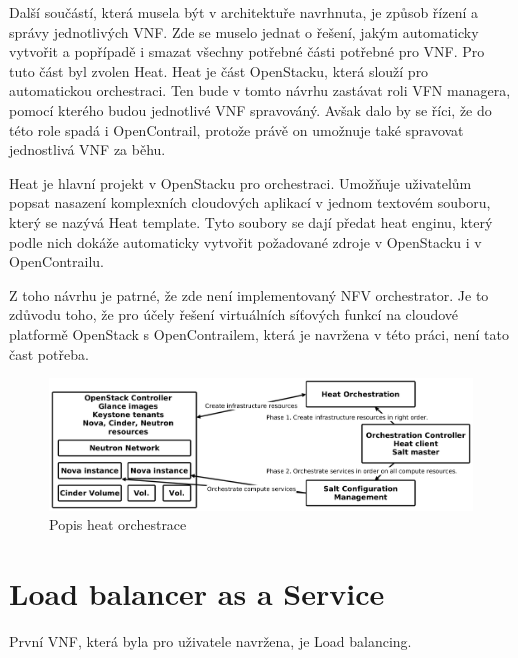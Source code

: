 Další součástí, která musela být v architektuře navrhnuta, je způsob řízení a správy jednotlivých VNF. Zde se muselo jednat o řešení, jakým automaticky vytvořit a popřípadě i smazat všechny potřebné části potřebné pro VNF. Pro tuto část byl zvolen Heat. Heat je část OpenStacku, která slouží pro automatickou orchestraci. Ten bude v tomto návrhu zastávat roli VFN managera, pomocí kterého budou jednotlivé VNF spravováný. Avšak dalo by se říci, že do této role spadá i OpenContrail, protože právě on umožnuje také spravovat jednostlivá VNF za běhu.  

Heat je hlavní projekt v OpenStacku pro orchestraci. Umožňuje uživatelům popsat nasazení komplexních cloudových aplikací v jednom textovém souboru, který se nazývá Heat template. Tyto soubory se dají předat heat enginu, který podle nich dokáže automaticky vytvořit požadované zdroje v OpenStacku i v OpenContrailu. 

Z toho návrhu je patrné, že zde není implementovaný NFV orchestrator. Je to zdůvodu toho, že pro účely řešení virtuálních síťových funkcí na cloudové platformě OpenStack s OpenContrailem, která je navržena v této práci, není tato čast potřeba. 



\begin{figure}[h]
\begin{centering}
\includegraphics[scale=0.21]{images/heat}
\par\end{centering}
\caption{Popis heat orchestrace\label{fig:heat}}
\end{figure}

\section{Load balancer as a Service}

První VNF, která byla pro uživatele navržena, je Load balancing. 

 

